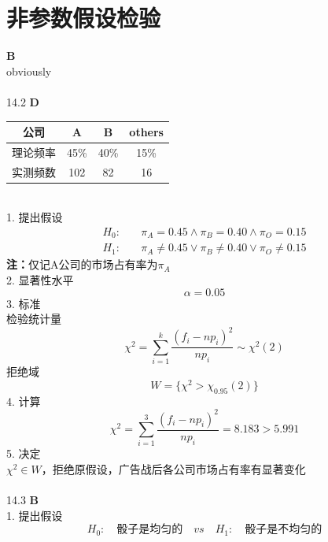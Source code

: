 \documentclass[a4paper]{ctexart}    %
\begin{document}
	\section{非参数假设检验}
	 \quad \textbf{B} \\
	obviously \\ \\
	14.2 \quad \textbf{D}
	\begin{table}[!htbp]
		\centering
		\begin{tabular}{c|ccc}
			\hline
			公司 & A & B & others \\ \hline
			理论频率 & 45\% & 40\% & 15\% \\ \hline
			实测频数 & 102 & 82 & 16 \\ \hline
		\end{tabular}
	\end{table} \\
	1. 提出假设
	\begin{equation*}
		\begin{split}
			H_0:& \quad \pi_A = 0.45 \wedge \pi_B = 0.40 \wedge \pi_O = 0.15 \\
			H_1:& \quad \pi_A \neq 0.45 \vee \pi_B \neq 0.40 \vee \pi_O \neq 0.15
		\end{split}
	\end{equation*}
	\textbf{注：}仅记A公司的市场占有率为$ \pi_A $ \\
	2. 显著性水平
	\begin{equation*}
		\alpha = 0.05
	\end{equation*}
	3. 标准 \\
	检验统计量
	\begin{equation*}
		\chi^2 = \sum\limits_{i=1}^{k} \frac{(f_i - np_i)^2}{np_i} \sim \chi^2(2)
	\end{equation*}
	拒绝域 \\
	\begin{equation*}
		W = \{\chi^2 > \chi_{0.95}(2)\}
	\end{equation*}
	4. 计算
	\begin{equation*}
		\chi^2 = \sum\limits_{i=1}^{3} \frac{(f_i - np_i)^2}{np_i} = 8.183 > 5.991
	\end{equation*}
	5. 决定 \\
	$ \chi^2 \in W $，拒绝原假设，广告战后各公司市场占有率有显著变化  \\ \\
	14.3 \quad \textbf{B} \\
	1. 提出假设
	\begin{equation*}
		H_0: \quad \text{骰子是均匀的} \quad vs \quad H_1: \quad \text{骰子是不均匀的}
	\end{equation*}
\end{document}
